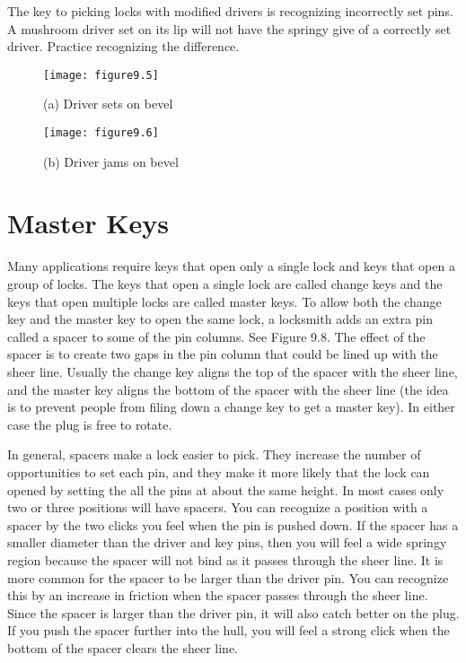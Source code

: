 The key to picking locks with modified drivers is recognizing incorrectly set pins. A
mushroom driver set on its lip will not have the springy give of a correctly set driver.
Practice recognizing the difference.

\begin{figure}
    \texttt{[image: figure9.5]}
    \caption{(a) Driver sets on bevel}
\end{figure}

\begin{figure}
    \texttt{[image: figure9.6]}
    \caption{(b) Driver jams on bevel}
\end{figure}

\section{Master Keys}
Many applications require keys that open only a single lock and keys that open a group
of locks. The keys that open a single lock are called change keys and the keys that open
multiple locks are called master keys. To allow both the change key and the master key to
open the same lock, a locksmith adds an extra pin called a spacer to some of the pin columns.
See Figure 9.8. The effect of the spacer is to create two gaps in the pin column that could
be lined up with the sheer line. Usually the change key aligns the top of the spacer with the
sheer line, and the master key aligns the bottom of the spacer with the sheer line (the idea
is to prevent people from filing down a change key to get a master key). In either case the
plug is free to rotate.

In general, spacers make a lock easier to pick. They increase the number of opportunities
to set each pin, and they make it more likely that the lock can opened by setting the all the
pins at about the same height. In most cases only two or three positions will have spacers.
You can recognize a position with a spacer by the two clicks you feel when the pin is pushed
down. If the spacer has a smaller diameter than the driver and key pins, then you will feel a
wide springy region because the spacer will not bind as it passes through the sheer line. It is
more common for the spacer to be larger than the driver pin. You can recognize this by an
increase in friction when the spacer passes through the sheer line. Since the spacer is larger
than the driver pin, it will also catch better on the plug. If you push the spacer further into
the hull, you will feel a strong click when the bottom of the spacer clears the sheer line.

